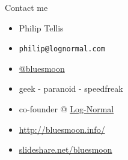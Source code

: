 \documentclass{beamer}
\begin{document}
\begin{frame}{Contact me}
  \begin{itemize}
  \item Philip Tellis
  \item \small{\texttt{philip@lognormal.com}}
  \item \href{http://twitter.com/bluesmoon}{@bluesmoon}
  \item geek - paranoid - speedfreak
  \item co-founder @ \href{http://www.lognormal.com/}{Log-Normal}
  \item \href{http://bluesmoon.info/}{http://bluesmoon.info/}
  \item \href{http://www.slideshare.net/bluesmoon}{slideshare.net/bluesmoon}
  \end{itemize}
\end{frame}
\end{document}
